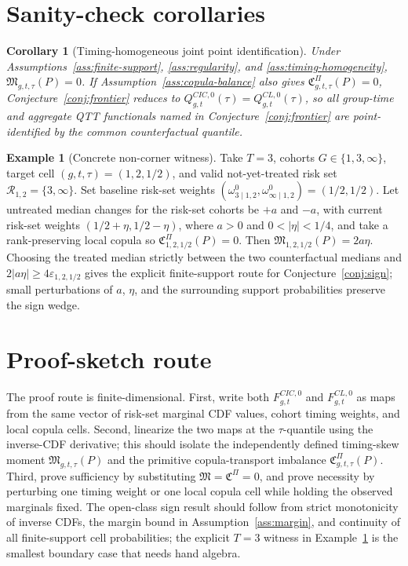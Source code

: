 \documentclass[11pt]{article}
\theoremstyle{definition}
\newtheorem{example}{Example}
\theoremstyle{plain}
\newtheorem{corollary}{Corollary}
\theoremstyle{remark}
\begin{document}
\section{Sanity-check corollaries}
\begin{corollary}[Timing-homogeneous joint point identification]\label{cor:homogeneous}
Under Assumptions~\ref{ass:finite-support}, \ref{ass:regularity}, and \ref{ass:timing-homogeneity}, \(\mathfrak M_{g,t,\tau}(P)=0\). If Assumption~\ref{ass:copula-balance} also gives \(\mathfrak C^{\Pi}_{g,t,\tau}(P)=0\), Conjecture~\ref{conj:frontier} reduces to \(Q^{CIC,0}_{g,t}(\tau)=Q^{CL,0}_{g,t}(\tau)\), so all group-time and aggregate QTT functionals named in Conjecture~\ref{conj:frontier} are point-identified by the common counterfactual quantile.
\end{corollary}

\begin{example}[Concrete non-corner witness]\label{ex:witness}
Take \(T=3\), cohorts \(G\in\{1,3,\infty\}\), target cell \((g,t,\tau)=(1,2,1/2)\), and valid not-yet-treated risk set \(\mathcal R_{1,2}=\{3,\infty\}\). Set baseline risk-set weights \((\omega^0_{3\mid1,2},\omega^0_{\infty\mid1,2})=(1/2,1/2)\). Let untreated median changes for the risk-set cohorts be \(+a\) and \(-a\), with current risk-set weights \((1/2+\eta,1/2-\eta)\), where \(a>0\) and \(0<|\eta|<1/4\), and take a rank-preserving local copula so \(\mathfrak C^{\Pi}_{1,2,1/2}(P)=0\). Then \(\mathfrak M_{1,2,1/2}(P)=2a\eta\). Choosing the treated median strictly between the two counterfactual medians and \(2|a\eta|\geq4\varepsilon_{1,2,1/2}\) gives the explicit finite-support route for Conjecture~\ref{conj:sign}; small perturbations of \(a\), \(\eta\), and the surrounding support probabilities preserve the sign wedge.
\end{example}

\section{Proof-sketch route}
The proof route is finite-dimensional. First, write both \(F^{CIC,0}_{g,t}\) and \(F^{CL,0}_{g,t}\) as maps from the same vector of risk-set marginal CDF values, cohort timing weights, and local copula cells. Second, linearize the two maps at the \(\tau\)-quantile using the inverse-CDF derivative; this should isolate the independently defined timing-skew moment \(\mathfrak M_{g,t,\tau}(P)\) and the primitive copula-transport imbalance \(\mathfrak C^{\Pi}_{g,t,\tau}(P)\). Third, prove sufficiency by substituting \(\mathfrak M=\mathfrak C^{\Pi}=0\), and prove necessity by perturbing one timing weight or one local copula cell while holding the observed marginals fixed. The open-class sign result should follow from strict monotonicity of inverse CDFs, the margin bound in Assumption~\ref{ass:margin}, and continuity of all finite-support cell probabilities; the explicit \(T=3\) witness in Example~\ref{ex:witness} is the smallest boundary case that needs hand algebra.
\end{document}
